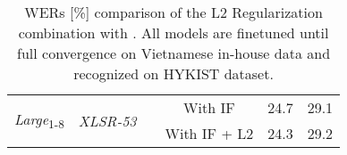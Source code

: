 \begin{table}[!ht]
\begin{adjustbox}{width=\columnwidth,center}
\begin{tabular}{|c|c|c|c|c|c|}
\cline{1-2}\cline{4-6}
\multirow{2}{*}{\textit{Large}\textsubscript{1-8}} & \multirow{2}{*}{\textit{XLSR-53}} &                                                                                 & With IF               & 24.7       & 29.1              \\ 
\cline{4-6}
                                   &                                   &                                                                                 & With IF + L2          & 24.3       & 29.2              \\
\hline
\end{tabular}
\end{adjustbox}
\caption{
    \glspl{WER} {[}\%{]} comparison of the L2 Regularization combination with .
    All models are finetuned until full convergence on Vietnamese in-house data and recognized on HYKIST dataset.
    }
\label{table:L2_comb}
\end{table}